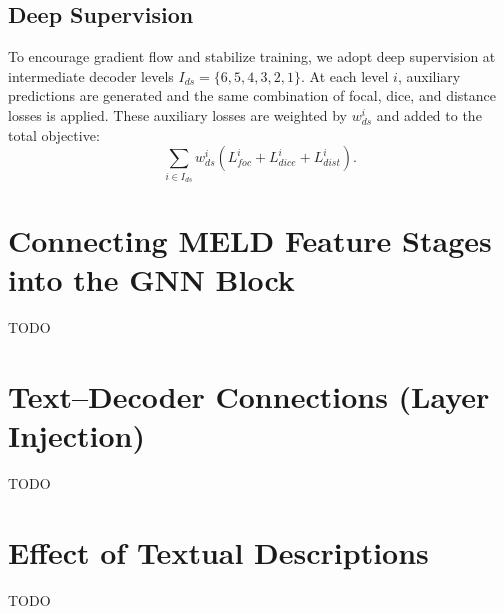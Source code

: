 \documentclass[FCD_GNN.tex]{subfiles}
\begin{document}
\subsection{Deep Supervision}
To encourage gradient flow and stabilize training, we adopt deep supervision at intermediate decoder levels $I_{ds} = \{6,5,4,3,2,1\}$. At each level $i$, auxiliary predictions are generated and the same combination of focal, dice, and distance losses is applied. These auxiliary losses are weighted by $w^i_{ds}$ and added to the total objective:
\[
\sum_{i \in I_{ds}} w^i_{ds}(L^i_{foc} + L^i_{dice} + L^i_{dist}).
\]

\bigskip

\section{Connecting MELD Feature Stages into the GNN Block}
TODO
\section{Text--Decoder Connections (Layer Injection)}
TODO
\section{Effect of Textual Descriptions}
TODO
\end{document}
